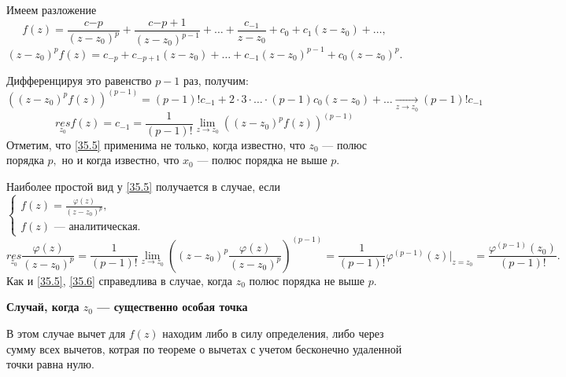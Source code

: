 \documentclass[../../main.tex]{subfiles}
\begin{document}
	Имеем разложение 
	\[
		f(z) = \frac{c{-p}}{(z-z_0)^{p}} + \frac{c{-p+1}}{(z-z_0)^{p-1}} + \ldots + 
		\frac{c_{-1}}{z-z_0} + c_0 + c_1(z-z_0) + \ldots,
	\]
	\[
		(z-z_0)^pf(z) = c_{-p} + c_{-p+1}(z-z_0) + \ldots + c_{-1}(z-z_0)^{p-1} + c_0(z-z_0)^p.
	\]
	
	Дифференцируя это равенство $p-1$ раз, получим:
	\[
		((z-z_0)^pf(z))^{(p-1)} = (p-1)!c_{-1} + 2 \cdot 3 \cdot \ldots \cdot (p-1)c_0(z-z_0) + \ldots 
		\underset{z \to z_0}{\to} (p-1)!c_{-1}
	\]
	\begin{equation} \label{35.5}
		\underset{z_0}{res} f(z) = c_{-1} = \frac{1}{(p-1)!}
		\lim\limits_{z\to z_0} ((z-z_0)^pf(z))^{(p-1)}
	\end{equation}
	Отметим, что \eqref{35.5} применима не только, когда известно, что $z_0$ --- полюс порядка $p,$ но и когда известно, что $x_0$ --- полюс порядка не выше $p.$
	
	Наиболее простой вид у \eqref{35.5} получается в случае, если $\begin{cases}
	f(z)  = \frac{\varphi(z)}{(z-z_0)^p}, \\
	f(z) \text{ --- аналитическая.}
	\end{cases}$
	\begin{equation} \label{35.6}
		\underset{z_0}{res}  \frac{\varphi(z)}{(z-z_0)^p} = \frac{1}{(p-1)!}
		 \lim\limits_{z\to z_0} \left((z-z_0)^p \frac{\varphi(z)}{(z-z_0)^p}\right)^{(p-1)} = 
		 \frac{1}{(p-1)!} \varphi^{(p-1)}(z)\bigg|_{z = z_0} = \frac{\varphi^{(p-1)}(z_0)}{(p-1)!}.
	\end{equation}
	Как и \eqref{35.5}, \eqref{35.6} справедлива в случае, когда $z_0$ полюс порядка не выше $p$.
	
	\textbf{Случай, когда $z_0$ --- существенно особая точка}
	
	В этом случае вычет для $f(z) $ находим либо в силу определения, либо через сумму всех вычетов, котрая по теореме о вычетах с учетом бесконечно удаленной точки равна нулю.
\end{document}
